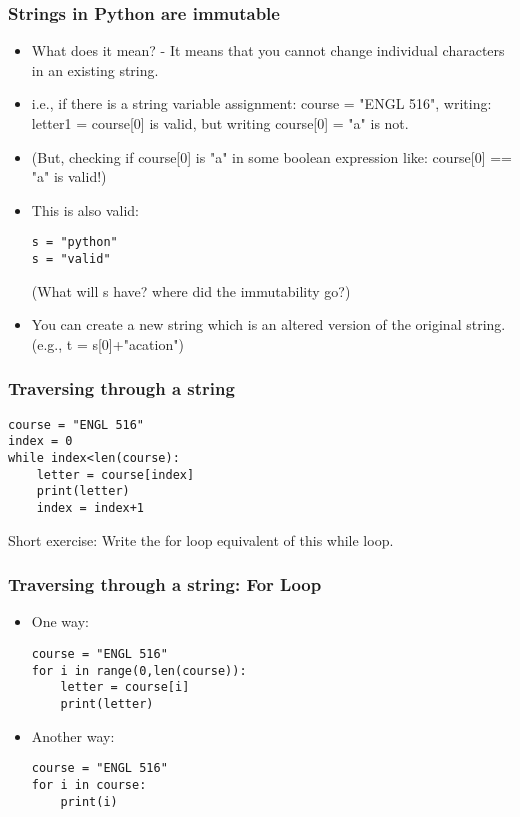 \documentclass{beamer}
\begin{document}
\begin{frame}[fragile]
\frametitle{Strings in Python are immutable}
\begin{itemize}
\item What does it mean? - It means that you cannot change individual characters in an existing string. 
\item i.e., if there is a string variable assignment: course = "ENGL 516", writing: letter1 = course[0] is valid, but writing course[0] = "a" is not. \pause
\item (But, checking if course[0] is "a" in some boolean expression like: course[0] == "a" is valid!) \pause
\item This is also valid: \scriptsize
\begin{verbatim}
s = "python"
s = "valid"
\end{verbatim} \normalsize
(What will s have? where did the immutability go?)
\item You can create a new string which is an altered version of the original string.  (e.g., t = s[0]+"acation")
\end{itemize}
\end{frame}

\begin{frame}[fragile]
\frametitle{Traversing through a string}
\begin{verbatim}
course = "ENGL 516"
index = 0
while index<len(course):
    letter = course[index]
    print(letter)
    index = index+1
\end{verbatim}

Short exercise: Write the for loop equivalent of this while loop.
\end{frame}

\begin{frame}[fragile]
\frametitle{Traversing through a string: For Loop}
\begin{itemize}
\item One way:
\begin{verbatim}
course = "ENGL 516"
for i in range(0,len(course)):
    letter = course[i]
    print(letter)
\end{verbatim}
\item Another way:
\begin{verbatim}
course = "ENGL 516"
for i in course:
    print(i)
\end{verbatim}
\end{itemize}
\end{frame}
\end{document}
